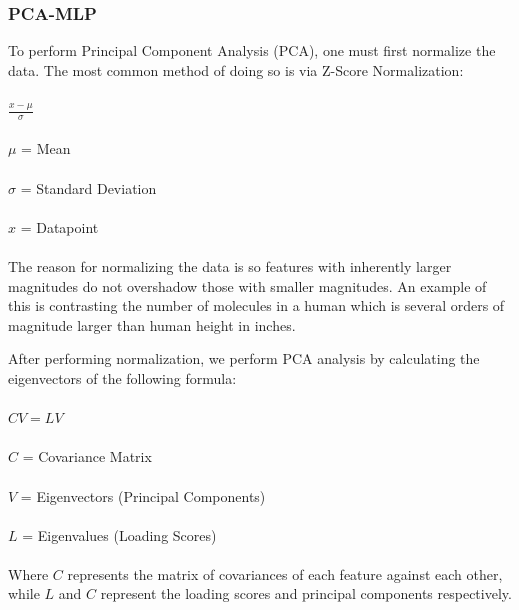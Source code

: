 \documentclass{article}
\begin{document}
\subsubsection{PCA-MLP} 

To perform Principal Component Analysis (PCA), one must first normalize the data. The most common method of doing so is via Z-Score Normalization: 
 \\
 \\$\frac{x-\mu}{\sigma}$ \\
 \\$\mu$ = Mean\\  
 \\$\sigma$ = Standard Deviation\\ 
 \\$x$ = Datapoint\\ 
 \\ 
The reason for normalizing the data is so features with inherently larger magnitudes do not overshadow those with smaller magnitudes. An example of this is contrasting the number of molecules in a human which is several orders of magnitude larger than human height in inches. 

After performing normalization, we perform PCA analysis by calculating the eigenvectors of the following formula: 
 \\ 
 \\$CV=LV$\\
 \\$C$ = Covariance Matrix\\  
 \\$V$ = Eigenvectors (Principal Components)\\ 
 \\$L$ = Eigenvalues (Loading Scores)\\ 
 \\  
Where $C$ represents the matrix of covariances of each feature against each other, while $L$ and $C$ represent the loading scores and principal components respectively. 
\end{document}
